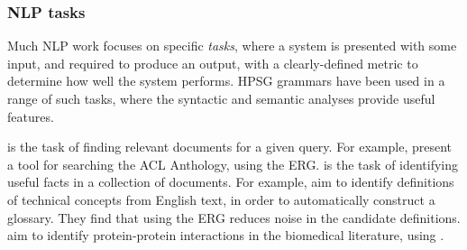 \documentclass[output=paper,nonflat]{langsci/langscibook}
\begin{document}

\subsubsection{NLP tasks}
\label{cl:downstream:nlp}


Much NLP work focuses on specific \textit{tasks},
where a system is presented with some input,
and required to produce an output,
with a clearly-defined metric to determine how well the system performs.
HPSG grammars have been used in a range of such tasks,
where the syntactic and semantic analyses provide useful features.

\textit{} is the task of finding relevant documents for a given query.
For example, \citet{schaefer2011acl} present a tool for searching the ACL Anthology, using the ERG.
\textit{} is the task of identifying useful facts in a collection of documents.
For example, \citet{reiplinger2012glossary} aim to identify definitions of technical concepts from English text,
in order to automatically construct a glossary.
They find that using the ERG reduces noise in the candidate definitions.
\citet{miyao2008protein} aim to identify protein-protein interactions in the  biomedical literature, using .
\end{document}
